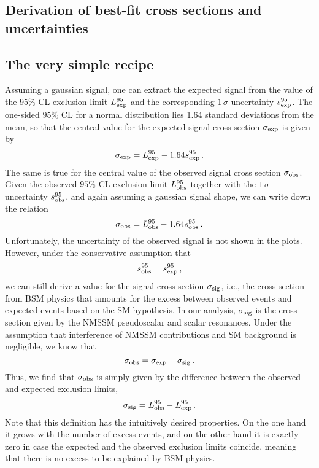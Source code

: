 \documentclass[12pt]{article}
\begin{document}
\begin{appendices}

\section{Derivation of best-fit cross sections and uncertainties}
\label{sec:best-fit-xs}

\subsection{The very simple recipe}
Assuming a gaussian signal, one can extract the expected signal
from the value of the $95\%$ CL exclusion limit $L_{\rm exp}^{95}$
and the corresponding $1\,\sigma$ uncertainty $s_{\rm exp}^{95}$.
The one-sided $95\%$ CL for a normal distribution
lies 1.64 standard deviations from the mean, so that the
central value for the expected signal cross section $\sigma_{\rm exp}$
is given by
\begin{equation}
\sigma_{\rm exp} = L_{\rm exp}^{95} - 1.64 s_{\rm exp}^{95} \, .
\end{equation}
The same is true for the central value of the observed signal
cross section $\sigma_{\rm obs}$. Given the observed $95\%$ CL
exclusion limit $L_{\rm obs}^{95}$ together with the
$1\,\sigma$ uncertainty $s_{\rm obs}^{95}$, and again assuming a gaussian
signal shape, we can write down the relation
\begin{equation}
\sigma_{\rm obs} = L_{\rm obs}^{95} - 1.64 s_{\rm obs}^{95} \, .
\end{equation}
Unfortunately, the uncertainty of the observed signal is not
shown in the plots. However, under the conservative assumption that
\begin{equation}
s_{\rm obs}^{95} = s_{\rm exp}^{95} \, ,
\end{equation}
we can still derive a value for the signal cross section $\sigma_{\rm sig}$,
i.e., the cross section from BSM physics that amounts for the
excess between observed events and expected events based on the
SM hypothesis. In our analysis, $\sigma_{\rm sig}$ is the cross section
given by the NMSSM pseudoscalar and scalar resonances.
Under the assumption that interference of NMSSM contributions and SM
background is negligible, we know that
\begin{equation}
\sigma_{\rm obs} = \sigma_{\rm exp} + \sigma_{\rm sig} \, .
\end{equation}
Thus, we find that $\sigma_{\rm obs}$ is simply given by
the difference between the observed and expected exclusion limits,
\begin{equation}
\sigma_{\rm sig} = L_{\rm obs}^{95} - L_{\rm exp}^{95} \, .
\end{equation}
Note that this definition has the intuitively desired properties.
On the one hand it grows with the number of excess events, and
on the other hand it is exactly zero in case the expected and
the observed exclusion limits coincide, meaning that there is
no excess to be explained by BSM physics.


\end{appendices}
\end{document}
